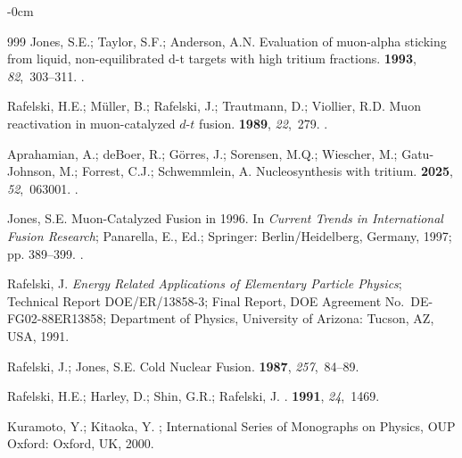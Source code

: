 \documentclass[particles,article,accept,pdftex,moreauthors]{Definitions/mdpi}
\begin{document}
\begin{adjustwidth}{-\extralength}{0cm}
\begin{thebibliography}{999}
Jones, S.E.; Taylor, S.F.;  Anderson, A.N.
\newblock Evaluation of muon-alpha sticking from liquid, non-equilibrated d-t
  targets with high tritium fractions.
 {\bf 1993}, {\em 82},~303--311.
.

Rafelski, H.E.; M{\"u}ller, B.;  Rafelski, J.; Trautmann, D.; Viollier, R.D.
\newblock Muon reactivation in muon-catalyzed $d$-$t$ fusion.
 {\bf 1989}, {\em 22},~279.
.

Aprahamian, A.; deBoer, R.;  Görres, J.; Sorensen, M.Q.; Wiescher, M.; Gatu-Johnson, M.; Forrest, C.J.; Schwemmlein, A.
\newblock Nucleosynthesis with tritium.
 {\bf 2025}, {\em 52},~063001.
.

Jones, S.E.
\newblock Muon-Catalyzed Fusion in 1996. In {\em Current Trends in
  International Fusion Research}; Panarella, E., Ed.; Springer: Berlin/Heidelberg, Germany,  1997; pp.
  389--399.
.

Rafelski, J.
\newblock \emph{Energy Related Applications of Elementary Particle Physics};
\newblock Technical Report DOE/ER/13858-3; Final Report, DOE Agreement No.\ DE-FG02-88ER13858; Department of Physics, University of
  Arizona: Tucson, AZ, USA,  1991.

Rafelski, J.; Jones, S.E.
\newblock Cold Nuclear Fusion.
 {\bf 1987}, {\em 257},~84--89.

Rafelski, H.E.; Harley, D.;  Shin, G.R.; Rafelski, J.
.
 {\bf 1991}, {\em 24},~1469.

Kuramoto, Y.; Kitaoka, Y.
; International Series of Monographs
  on Physics, OUP Oxford: Oxford, UK,  2000.


\end{thebibliography}
\end{adjustwidth}
\end{document}

